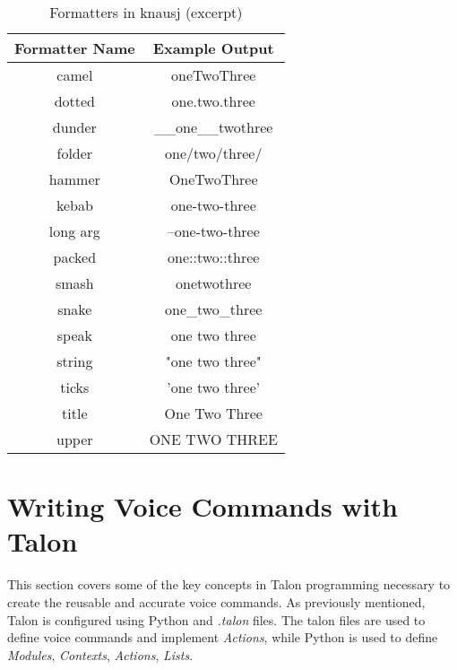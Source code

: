 \documentclass[../thesis.tex]{subfiles}
\begin{document}
\begin{table}[htpb]
   \centering
   \label{tab:formatters}
   \begin{tabular}{|c|c|}
      \toprule
      Formatter Name & Example Output \\
      \midrule
      camel & oneTwoThree  \\
      dotted & one.two.three  \\
      dunder & \_\_one\_\_twothree  \\
      folder & one/two/three/  \\
      hammer & OneTwoThree  \\
      kebab & one-two-three  \\
      long arg & --one-two-three  \\
      packed & one::two::three  \\
      smash & onetwothree  \\
      snake & one\_two\_three  \\
      speak & one two three  \\
      string & "one two three"  \\
      ticks & 'one two three'  \\
      title & One Two Three  \\
      upper & ONE TWO THREE  \\
      \bottomrule
   \end{tabular}
   \caption{Formatters in knausj (excerpt)}
\end{table}





\section{Writing Voice Commands with Talon}\label{wvc}
This section covers some of the key concepts in Talon programming necessary to
create the reusable and accurate voice commands.
As previously mentioned, Talon is configured using Python and \textit{.talon} files.
The talon files are used to define voice commands and implement \textit{Actions}, while Python is used to
define \textit{Modules}, \textit{Contexts}, \textit{Actions}, \textit{Lists}.
\end{document}

